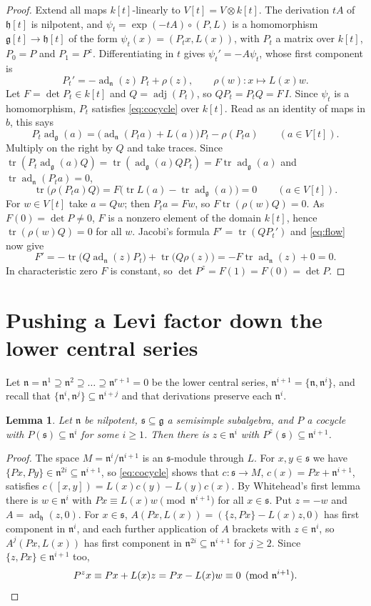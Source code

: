 \documentclass[11pt]{article}
\newtheorem{lemma}[theorem]{Lemma}
\theoremstyle{definition}
\theoremstyle{remark}
\newcommand{\g}{\mathfrak{g}}
\newcommand{\n}{\mathfrak{n}}
\newcommand{\s}{\mathfrak{s}}
\newcommand{\h}{\mathfrak{h}}
\DeclareMathOperator{\ad}{ad}
\DeclareMathOperator{\tr}{tr}
\DeclareMathOperator{\adj}{adj}
\begin{document}
\begin{proof}
Extend all maps $k[t]$-linearly to $V[t]=V\otimes k[t]$. The derivation
$tA$ of $\h[t]$ is nilpotent, and $\psi_t=\exp(-tA)\circ(P,L)$ is a
homomorphism $\g[t]\to\h[t]$ of the form $\psi_t(x)=(P_tx,L(x))$, with
$P_t$ a matrix over $k[t]$, $P_0=P$ and $P_1=P^z$. Differentiating in $t$
gives $\psi_t'=-A\psi_t$, whose first component is
\begin{equation}\label{eq:flow}
P_t'=-\ad_\n(z)\,P_t+\rho(z),\qquad \rho(w)\colon x\mapsto L(x)w.
\end{equation}
Let $F=\det P_t\in k[t]$ and $Q=\adj(P_t)$, so $QP_t=P_tQ=F\,I$. Since
$\psi_t$ is a homomorphism, $P_t$ satisfies \eqref{eq:cocycle} over
$k[t]$. Read as an identity of maps in $b$, this says
\[
P_t\ad_\g(a)=\bigl(\ad_\n(P_ta)+L(a)\bigr)P_t-\rho(P_ta)\qquad(a\in V[t]).
\]
Multiply on the right by $Q$ and take traces. Since
$\tr(P_t\ad_\g(a)Q)=\tr(\ad_\g(a)QP_t)=F\tr\ad_\g(a)$ and
$\tr\ad_\n(P_ta)=0$,
\[
\tr\bigl(\rho(P_ta)Q\bigr)=F\bigl(\tr L(a)-\tr\ad_\g(a)\bigr)=0
\qquad(a\in V[t]).
\]
For $w\in V[t]$ take $a=Qw$; then $P_ta=Fw$, so $F\tr(\rho(w)Q)=0$. As
$F(0)=\det P\ne0$, $F$ is a nonzero element of the domain $k[t]$, hence
$\tr(\rho(w)Q)=0$ for all $w$. Jacobi's formula $F'=\tr(QP_t')$ and
\eqref{eq:flow} now give
\[
F'=-\tr\bigl(Q\ad_\n(z)P_t\bigr)+\tr\bigl(Q\rho(z)\bigr)
=-F\tr\ad_\n(z)+0=0.
\]
In characteristic zero $F$ is constant, so
$\det P^z=F(1)=F(0)=\det P$.
\end{proof}

\section{Pushing a Levi factor down the lower central series}

Let $\n=\n^1\supseteq\n^2\supseteq\dots\supseteq\n^{r+1}=0$ be the lower
central series, $\n^{i+1}=\{\n,\n^i\}$, and recall that
$\{\n^i,\n^j\}\subseteq\n^{i+j}$ and that derivations preserve each
$\n^i$.

\begin{lemma}\label{lem:whitehead}
Let $\n$ be nilpotent, $\s\subseteq\g$ a semisimple subalgebra, and $P$ a
cocycle with $P(\s)\subseteq\n^i$ for some $i\ge1$. Then there is
$z\in\n^i$ with $P^z(\s)\subseteq\n^{i+1}$.
\end{lemma}

\begin{proof}
The space $M=\n^i/\n^{i+1}$ is an $\s$-module through $L$. For
$x,y\in\s$ we have $\{Px,Py\}\in\n^{2i}\subseteq\n^{i+1}$, so
\eqref{eq:cocycle} shows that $c\colon\s\to M$, $c(x)=Px+\n^{i+1}$,
satisfies $c([x,y])=L(x)c(y)-L(y)c(x)$. By Whitehead's first lemma there is
$w\in\n^i$ with $Px\equiv L(x)w\pmod{\n^{i+1}}$ for all $x\in\s$. Put
$z=-w$ and $A=\ad_\h(z,0)$. For $x\in\s$,
$A(Px,L(x))=(\{z,Px\}-L(x)z,0)$ has first component in $\n^i$, and each
further application of $A$ brackets with $z\in\n^i$, so $A^j(Px,L(x))$
has first component in $\n^{2i}\subseteq\n^{i+1}$ for $j\ge2$. Since
$\{z,Px\}\in\n^{i+1}$ too,
\[
P^zx\equiv Px+L(x)z=Px-L(x)w\equiv0\pmod{\n^{i+1}}.\qedhere
\]
\end{proof}
\end{document}
